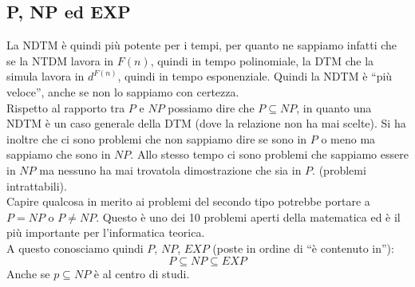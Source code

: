 \subsection{P, NP ed EXP}
La NDTM è quindi più potente per i tempi, per quanto ne sappiamo infatti che se
la NTDM lavora in $F(n)$, quindi in tempo polinomiale, la DTM che la simula
lavora in $d^{F(n)}$, quindi in tempo esponenziale. Quindi la NDTM è ``più
veloce'', anche se non lo sappiamo con certezza.\\
Rispetto al rapporto tra $P$ e $NP$ possiamo dire che $P\subseteq NP$, in quanto
una NDTM è un caso generale della DTM (dove la relazione non ha mai scelte). Si
ha inoltre che ci sono problemi che non sappiamo dire se sono in $P$ o meno ma sappiamo che sono in $NP$. Allo stesso tempo ci sono problemi che sappiamo essere in $NP$ ma nessuno ha mai trovatola dimostrazione che sia in $P$. (problemi intrattabili).\\
Capire qualcosa in merito ai problemi del secondo tipo potrebbe portare a $P=NP$
o $P\neq NP$. Questo è uno dei 10 problemi aperti della matematica ed è
il più importante per l'informatica teorica.\\
A questo conosciamo quindi $P$, $NP$, $EXP$ (poste in ordine di ``è contenuto
in''):
\[P\subseteq NP \subseteq EXP\]
Anche se $p\subseteq NP$ è al centro di studi.\\
